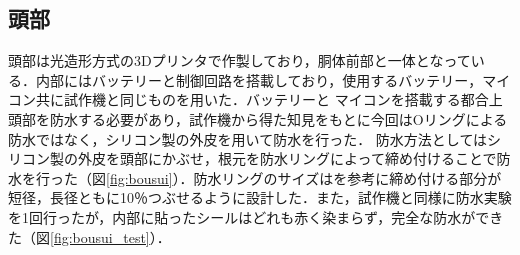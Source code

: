 \subsection{頭部}
頭部は光造形方式の3Dプリンタで作製しており，胴体前部と一体となっている．内部にはバッテリーと制御回路を搭載しており，使用するバッテリー，マイコン共に試作機と同じものを用いた．バッテリーと
マイコンを搭載する都合上頭部を防水する必要があり，試作機から得た知見をもとに今回はOリングによる防水ではなく，シリコン製の外皮を用いて防水を行った．
防水方法としてはシリコン製の外皮を頭部にかぶせ，根元を防水リングによって締め付けることで防水を行った（図\ref{fig:bousui}）．防水リングのサイズは\cite{juuiti}を参考に締め付ける部分が
短径，長径ともに10％つぶせるように設計した．また，試作機と同様に防水実験を1回行ったが，内部に貼ったシールはどれも赤く染まらず，完全な防水ができた（図\ref{fig:bousui_test}）．

